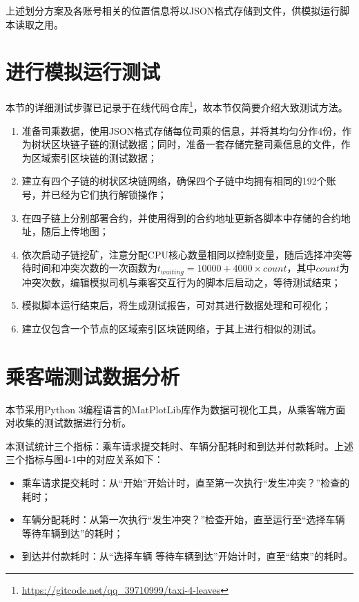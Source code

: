上述划分方案及各账号相关的位置信息将以JSON格式存储到文件，供模拟运行脚本读取之用。

\section{进行模拟运行测试}

本节的详细测试步骤已记录于在线代码仓库\footnote{\url{https://gitcode.net/qq_39710999/taxi-4-leaves}}，故本节仅简要介绍大致测试方法。

\begin{enumerate}
    \item 准备司乘数据，使用JSON格式存储每位司乘的信息，并将其均匀分作4份，作为树状区块链子链的测试数据；同时，准备一套存储完整司乘信息的文件，作为区域索引区块链的测试数据；
    \item 建立有四个子链的树状区块链网络，确保四个子链中均拥有相同的192个账号，并已经为它们执行解锁操作；
    \item 在四子链上分别部署合约，并使用得到的合约地址更新各脚本中存储的合约地址，随后上传地图；
    \item 依次启动子链挖矿，注意分配CPU核心数量相同以控制变量，随后选择冲突等待时间和冲突次数的一次函数为$t_{waiting} = 10000 + 4000 \times count$，其中$count$为冲突次数，编辑模拟司机与乘客交互行为的脚本后启动之，等待测试结束；
    \item 模拟脚本运行结束后，将生成测试报告，可对其进行数据处理和可视化；
    \item 建立仅包含一个节点的区域索引区块链网络，于其上进行相似的测试。
\end{enumerate}

\section{乘客端测试数据分析}

本节采用Python 3编程语言的MatPlotLib库作为数据可视化工具，从乘客端方面对收集的测试数据进行分析。

本测试统计三个指标：乘车请求提交耗时、车辆分配耗时和到达并付款耗时。上述三个指标与图4-1中的对应关系如下：

\begin{itemize}
    \item 乘车请求提交耗时：从“开始”开始计时，直至第一次执行“发生冲突？”检查的耗时；
    \item 车辆分配耗时：从第一次执行“发生冲突？”检查开始，直至运行至“选择车辆 等待车辆到达”的耗时；
    \item 到达并付款耗时：从“选择车辆 等待车辆到达”开始计时，直至“结束”的耗时。
\end{itemize}

